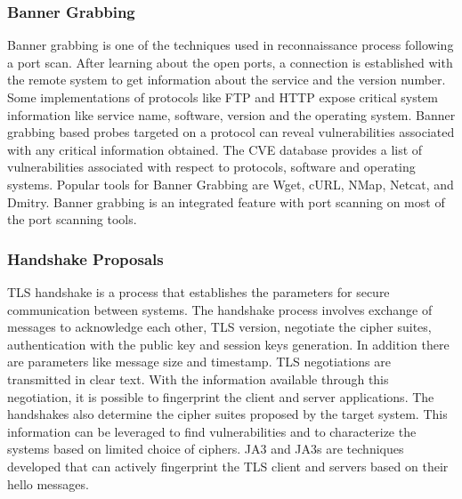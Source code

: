 \documentclass[letterpaper, 10 pt, conference]{ieeeconf}  %
\begin{document}
\subsubsection{Banner Grabbing}
Banner grabbing is one of the techniques used in reconnaissance process following a port scan. After learning about the open ports, a connection is established with the remote system to get information about the service and the version number. Some implementations of protocols like FTP and HTTP expose critical system information like service name, software, version and the operating system. Banner grabbing based probes targeted on a protocol can reveal vulnerabilities associated with any critical information obtained. The CVE database \cite{CVE} provides a list of vulnerabilities associated with respect to protocols, software and operating systems. Popular tools for Banner Grabbing are Wget, cURL, NMap, Netcat, and Dmitry. Banner grabbing is an integrated feature with port scanning on most of the port scanning tools.  
\newline
\subsubsection{Handshake Proposals}
TLS handshake is a process that establishes the parameters for secure communication between systems. The handshake process involves exchange of messages to acknowledge each other, TLS version,  negotiate the cipher suites, authentication with the public key and session keys generation. In addition there are parameters like message size and timestamp. TLS negotiations are transmitted in clear text. With the information available through this negotiation, it is possible to fingerprint the client and server applications.  The handshakes also determine the cipher suites proposed by the target system. This information can be leveraged to find vulnerabilities and to characterize the systems based on limited choice of ciphers. JA3 and JA3s\cite{JA3} are techniques developed that can actively fingerprint the TLS client and servers based on their hello messages.
\newline
\end{document}
